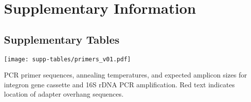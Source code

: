 \chapter{Supplementary Information}

\section{Supplementary Tables}

\begin{supptable}[htpb]
	\centering
		\texttt{[image: supp-tables/primers\_v01.pdf]}
	\caption[PCR primer sequences, annealing temperatures, and expected amplicon sizes for integron gene cassette and 16S rDNA PCR amplification.]{
		PCR primer sequences, annealing temperatures, and expected amplicon sizes for integron gene cassette and 16S rDNA PCR amplification.
    Red text indicates location of adapter overhang sequences.
	}
	\label{supp-table:primers}
\end{supptable}
